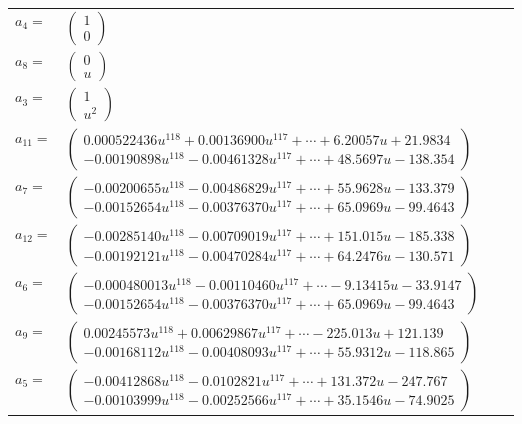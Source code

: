 \documentclass[1p]{elsarticle_modified}
\theoremstyle{definition}
\begin{document}
\begin{tabular}{m{7pt} m{180pt} m{7pt} m{180pt} }
\flushright $a_{4}=$&$\begin{pmatrix}1\\0\end{pmatrix}$ \\
\flushright $a_{8}=$&$\begin{pmatrix}0\\u\end{pmatrix}$ \\
\flushright $a_{3}=$&$\begin{pmatrix}1\\u^2\end{pmatrix}$ \\
\flushright $a_{11}=$&$\begin{pmatrix}0.000522436 u^{118}+0.00136900 u^{117}+\cdots+6.20057 u+21.9834\\-0.00190898 u^{118}-0.00461328 u^{117}+\cdots+48.5697 u-138.354\end{pmatrix}$ \\
\flushright $a_{7}=$&$\begin{pmatrix}-0.00200655 u^{118}-0.00486829 u^{117}+\cdots+55.9628 u-133.379\\-0.00152654 u^{118}-0.00376370 u^{117}+\cdots+65.0969 u-99.4643\end{pmatrix}$ \\
\flushright $a_{12}=$&$\begin{pmatrix}-0.00285140 u^{118}-0.00709019 u^{117}+\cdots+151.015 u-185.338\\-0.00192121 u^{118}-0.00470284 u^{117}+\cdots+64.2476 u-130.571\end{pmatrix}$ \\
\flushright $a_{6}=$&$\begin{pmatrix}-0.000480013 u^{118}-0.00110460 u^{117}+\cdots-9.13415 u-33.9147\\-0.00152654 u^{118}-0.00376370 u^{117}+\cdots+65.0969 u-99.4643\end{pmatrix}$ \\
\flushright $a_{9}=$&$\begin{pmatrix}0.00245573 u^{118}+0.00629867 u^{117}+\cdots-225.013 u+121.139\\-0.00168112 u^{118}-0.00408093 u^{117}+\cdots+55.9312 u-118.865\end{pmatrix}$ \\
\flushright $a_{5}=$&$\begin{pmatrix}-0.00412868 u^{118}-0.0102821 u^{117}+\cdots+131.372 u-247.767\\-0.00103999 u^{118}-0.00252566 u^{117}+\cdots+35.1546 u-74.9025\end{pmatrix}$ \\

\end{tabular}
\end{document}
